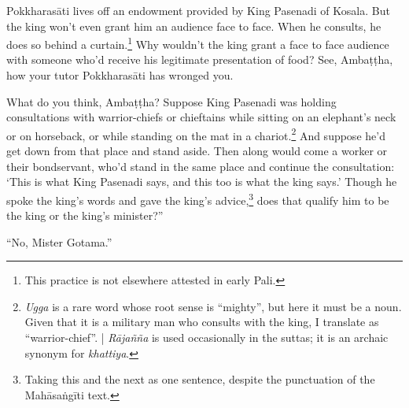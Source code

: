 \documentclass[12pt,openany]{book}%
\begin{document}
\textsanskrit{Pokkharasāti} lives off an endowment provided by King Pasenadi of Kosala. But the king won’t even grant him an audience face to face. When he consults, he does so behind a curtain.\footnote{This practice is not elsewhere attested in early Pali. } Why wouldn’t the king grant a face to face audience with someone who’d receive his legitimate presentation of food? See, \textsanskrit{Ambaṭṭha}, how your tutor \textsanskrit{Pokkharasāti} has wronged you. 

What do you think, \textsanskrit{Ambaṭṭha}? Suppose King Pasenadi was holding consultations with warrior-chiefs or chieftains while sitting on an elephant’s neck or on horseback, or while standing on the mat in a chariot.\footnote{\textit{Ugga} is a rare word whose root sense is “mighty”, but here it must be a noun. Given that it is a military man who consults with the king, I translate as “warrior-chief”. | \textit{\textsanskrit{Rājañña}} is used occasionally in the suttas; it is an archaic synonym for \textit{khattiya}. } And suppose he’d get down from that place and stand aside. Then along would come a worker or their bondservant, who’d stand in the same place and continue the consultation: ‘This is what King Pasenadi says, and this too is what the king says.’ Though he spoke the king’s words and gave the king’s advice,\footnote{Taking this and the next as one sentence, despite the punctuation of the \textsanskrit{Mahāsaṅgīti} text. } does that qualify him to be the king or the king’s minister?” 

“No, Mister Gotama.” 
\end{document}
